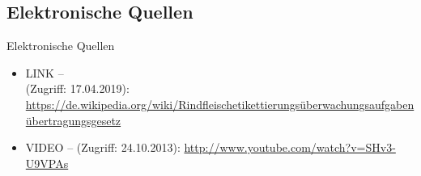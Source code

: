 \subsection*{Elektronische Quellen}

\begin{frame}[allowframebreaks]{Elektronische Quellen}

\footnotesize

\begin{itemize}
	
	\item LINK -- \\
	(Zugriff: 17.04.2019):
	\url{https://de.wikipedia.org/wiki/Rindfleischetikettierungsüberwachungsaufgabenübertragungsgesetz}
	
	\item VIDEO --  (Zugriff: 24.10.2013): \url{http://www.youtube.com/watch?v=SHv3-U9VPAs}
	
\end{itemize}

\end{frame}



%
%
%
%
%


%
%
%
%
%


